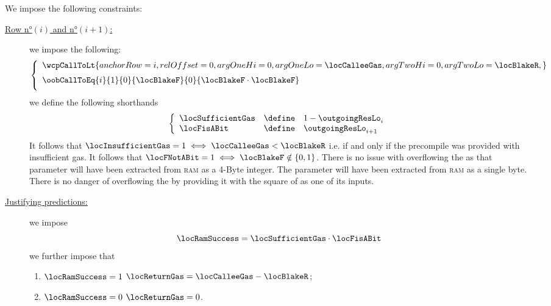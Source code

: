 We impose the following constraints:
\begin{description}
	\item[\underline{Row n°$(i)$ and n°$(i + 1)$:}] we impose the following:
	      \[
		      \left\{ \begin{array}{l}
			      \wcpCallToLt {
				      anchorRow = i             ,
				      relOffset = 0             ,
				      argOneHi  = 0             ,
				      argOneLo  = \locCalleeGas ,
				      argTwoHi  = 0             ,
				      argTwoLo  = \locBlakeR    ,
			      }
			      \vspace{2mm} \\
			      \oobCallToEq
			      {i}{1}
			      {0}{\locBlakeF}
			      {0}{\locBlakeF \cdot \locBlakeF}
			      \vspace{2mm} \\
		      \end{array} \right.
	      \]
	      we define the following shorthands
	      \[
		      \left\{ \begin{array}{lcl}
			      \locSufficientGas & \define & 1 - \outgoingResLo _{i} \\
			      \locFisABit       & \define & \outgoingResLo _{i + 1} \\
		      \end{array} \right.
	      \]
	      It follows that $\locInsufficientGas = 1 \iff \locCalleeGas < \locBlakeR$ i.e. if and only if the  precompile was provided with insufficient gas.
	      It follows that $\locFNotABit = 1 \iff \locBlakeF \notin \{0, 1\}$.
	      \saNote{} There is no issue with \locBlakeR{} overflowing the \wcpMod{} as that parameter will have been extracted from \textsc{ram} as a 4-Byte integer.
	      \saNote{} The parameter \locBlakeF{} will have been extracted from \textsc{ram} as a single byte. There is no danger of overflowing the \wcpMod{} by providing it with the square of \locBlakeF{} as one of its inputs.
	\item[\underline{Justifying \hubMod{} predictions:}]
	      we impose
	      \[
		      \locRamSuccess = \locSufficientGas \cdot \locFisABit
	      \]
	      we further impose that
	      \begin{enumerate}
		      \item \If $\locRamSuccess = 1$ \Then \( \locReturnGas = \locCalleeGas - \locBlakeR \);
		      \item \If $\locRamSuccess = 0$ \Then \( \locReturnGas = 0 \).
	      \end{enumerate}
\end{description}
